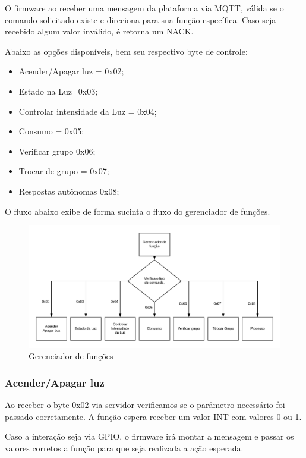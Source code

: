 \documentclass[openright]{normas-utf-tex} %
\begin{document}
O firmware ao receber uma mensagem da plataforma via MQTT, válida se o comando solicitado existe e direciona para sua função específica. Caso seja recebido algum valor inválido, é retorna um NACK.

Abaixo as opções disponíveis, bem seu respectivo byte de controle:

\begin{itemize}
    \item Acender/Apagar luz = 0x02;
    \item Estado na Luz=0x03;
    \item Controlar intensidade da Luz = 0x04;
    \item Consumo = 0x05;
    \item Verificar grupo 0x06;
    \item Trocar de grupo = 0x07;
    \item Respostas autônomas 0x08;
\end{itemize}

O fluxo abaixo exibe de forma sucinta o fluxo do gerenciador de funções.

\begin{figure}[!htb]
     \centering
     \includegraphics[scale=0.7]{3_flux.png}
     \caption{Gerenciador de funções}
     \label{}
\end{figure}


\subsubsection{Acender/Apagar luz}

Ao receber o byte 0x02 via servidor verificamos se o parâmetro necessário foi passado corretamente. A função espera receber um valor INT com valores 0 ou 1.

Caso a interação seja via GPIO, o firmware irá montar a mensagem e passar os valores corretos a função para que seja realizada a ação esperada.
\end{document}

